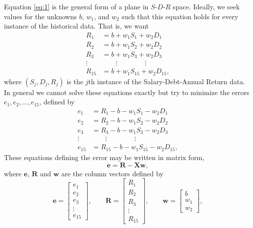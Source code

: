 \documentclass[11pt, reqno]{amsart} \usepackage{hyperlatex}
\begin{document}
Equation \eqref{eq:1} is the general form of a plane in $S$-$D$-$R$
space. Ideally, we seek values for the unknowns $b$, $w_1$, and $w_2$
such that this equation holds for every instance of the historical
data. That is, we want
\begin{align*}
  R_1 &= b + w_1 S_1 + w_2 D_1\\
  R_2 &= b + w_1 S_2 + w_2 D_2\\
R_3 &= b + w_1 S_3+ w_2 D_3\\
\vdots & \qquad \vdots \qquad \qquad \vdots\\
R_{15} &= b + w_1 S_{15} + w_2 D_{15},
\end{align*}
where $(S_j,D_j,R_j)$ is the $j$th instance of the Salary-Debt-Annual
Return data. In general we cannot solve these equations exactly but
try to minimize the errors $e_1, e_2, \ldots, e_{15}$, defined by
\begin{align*}
  e_1 &= R_1 - b - w_1 S_1 - w_2 D_1\\
  e_2 &= R_2 - b - w_1 S_2 - w_2 D_2\\
  e_3 &= R_3 - b - w_1 S_3 - w_2 D_3\\
\vdots & \qquad \vdots \qquad \qquad \vdots\\
e_{15} &= R_{15} - b - w_1 S_{15} - w_2 D_{15},
\end{align*}
These equations defining the error may be written in matrix form,
\begin{equation*}
   {\mathbf e} = {\mathbf R} - {\mathbf X} {\mathbf w},  
\end{equation*}
where $\mathbf e$, $\mathbf R$ and $\mathbf w$ are the column vectors
defined by
\begin{equation*}
{\mathbf e} =
\begin{bmatrix}
  e_1\\
e_2\\
e_3\\
\vdots\\
e_{15}
\end{bmatrix}, \qquad 
{\mathbf R} =
\begin{bmatrix}
  R_1\\
  R_2\\
  R_3\\
  \vdots\\
  R_{15}
\end{bmatrix}, \qquad 
{\mathbf w} = 
\begin{bmatrix}
  b\\
w_1\\
w_2
\end{bmatrix},  
\end{equation*}
\end{document}

